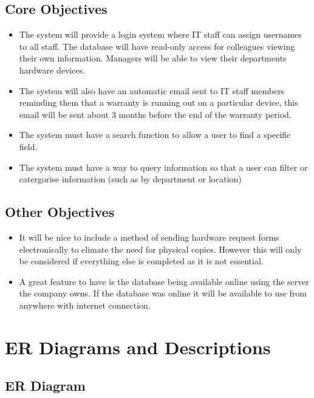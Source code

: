\subsection{Core Objectives}
\begin{itemize}
\item The system will provide a login system where IT staff can assign usernames to all staff. The database will have read-only access for colleagues viewing their own information. Managers will be able to view their departments hardware devices.
\item The system will also have an automatic email sent to IT staff members reminding them that a warranty is running out on a particular device, this email will be sent about 3 months before the end of the warranty period.
\item The system must have a search function to allow a user to find a specific field.
\item The system must have a way to query information so that a user can filter or catergorise information (such as by department or location)
\end{itemize}

\subsection{Other Objectives}

\begin{itemize}
\item It will be nice to include a method of sending hardware request forms electronically to elimate the need for physical copies. However this will only be considered if everything else is completed as it is not essential.
\item A great feature to have is the database being available online using the server the company owns. If the database was online it will be available to use from anywhere with internet connection.
\end{itemize}

\section{ER Diagrams and Descriptions}

\subsection{ER Diagram}

